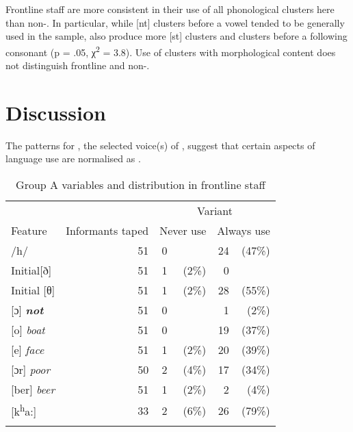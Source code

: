   Frontline staff are more consistent in their use of all phonological clusters here than non-.  In particular, while [nt] clusters before a vowel tended to be generally used in the  sample,  also produce more [st] clusters and clusters before a following consonant (p = .05, χ\textsuperscript{2} = 3.8).    Use of clusters with morphological content does not distinguish frontline and non-.  

\section{Discussion}\label{sec:4.3}

The patterns for , the selected voice(s) of , suggest that certain aspects of language use are normalised as .\largerpage


\begin{table}[p]
\begin{tabular}{l r *{2}{rr}}
\lsptoprule
		&				   & \multicolumn{4}{c}{Variant}\\\cmidrule(lr){3-6}
Feature & Informants taped & \multicolumn{2}{c}{Never use}  & \multicolumn{2}{c}{Always use}\\
\midrule
/h/                         & 51 & 0 &       & 24\cellcolor{lsLightGray} & (47\%)\cellcolor{lsLightGray} \\\relax
{Initial[ð]}                & 51 & 1 & (2\%) & 0  &        \\\relax
Initial [θ]                 & 51 & 1 & (2\%) & 28\cellcolor{lsGuidelinesGray} & (55\%)\cellcolor{lsGuidelinesGray} \\\relax
{[ɔ}] \textbf{\textit{not}} & 51 & 0 &       & 1  &  (2\%) \\\relax
{[o] \textit{boat}}          & 51 & 0 &       & 19 & (37\%) \\\relax
{[e] \textit{face}}          & 51 & 1 & (2\%) & 20 & (39\%) \\\relax
{[ɔr] \textit{poor}}         & 50 & 2 & (4\%) & 17 & (34\%) \\\relax
{[ber] \textit{beer}}        & 51 & 1 & (2\%) & 2  &  (4\%) \\\relax
{[k\textsuperscript{h}a:]}  & 33 & 2 & (6\%) & 26\cellcolor{lsGuidelinesGray} & (79\%) \cellcolor{lsGuidelinesGray}\\
\lspbottomrule
\end{tabular}
\caption{Group A variables and distribution in frontline staff\label{tab:4.14}}
\end{table}

